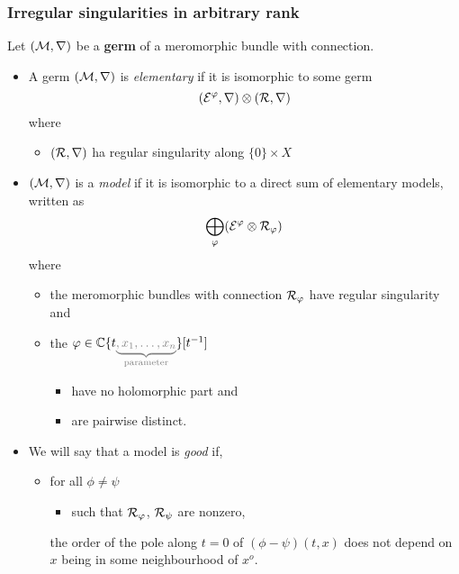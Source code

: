 \subsubsection{Irregular singularities in arbitrary rank}
\begin{defn}
  Let $(\mathcal{M},\nabla)$ be a \textbf{germ} of a meromorphic bundle with
  connection.
  \begin{itemize}
    \item A germ $(\mathcal{M},\nabla)$ is \emph{elementary} if it is isomorphic to
      some germ
      \[
        (\mathcal{E}^\varphi,\nabla)\otimes(\mathcal{R},\nabla)
      \]
      where
      \begin{itemize}
        \item $(\mathcal{R},\nabla)$ ha regular singularity along $\{0\}\times X$
      \end{itemize}
    \item $(\mathcal{M},\nabla)$ is a \emph{model} if it is isomorphic to a direct sum
      of elementary models, written as
      \[
        \bigoplus_\varphi(\mathcal{E}^\varphi\otimes\mathcal{R}_\varphi)
      \]
      where
      \begin{itemize}
        \item the meromorphic bundles with connection $\mathcal{R}_\varphi$ have regular
          singularity and
        \item the
          $\phi\in\C\{t\textcolor{gray}{\underset{\text{parameter}}
            {\underbrace{,x_1,\ldots,x_n}}}\}[t^{-1}]$
          \begin{itemize}
            \item have no holomorphic part and
            \item are pairwise distinct.
          \end{itemize}
      \end{itemize}
    \item We will say that a model is \emph{good} if,
      \begin{itemize}
        \item for all $\phi\neq\psi$
          \begin{itemize}
            \item such that $\mathcal{R}_\varphi$, $\mathcal{R}_\psi$ are nonzero,
          \end{itemize}
          the order of the pole along $t=0$ of $(\phi-\psi)(t,x)$ does not
          depend on $x$ being in some neighbourhood of $x^o$.
      \end{itemize}
  \end{itemize}
\end{defn}
